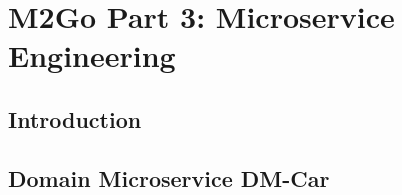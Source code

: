 \chapter{M2Go Part 3: Microservice Engineering}
\label{cha:microservice_engineering}
\section{Introduction}



\section{Domain Microservice DM-Car}



